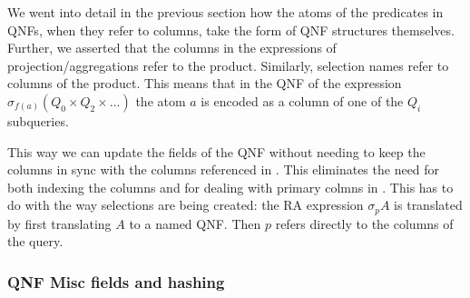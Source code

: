 We went into detail in the previous section how the atoms of the predicates in QNFs,
when they refer to columns, take the form of QNF structures themselves. Further, we asserted
that the columns in the expressions of projection/aggregations refer to the
product. Similarly, selection names refer to columns of the product.
This means that in the QNF of the expression \(\sigma_{f(a)} (Q_0 \times Q_2 \times ...)\)
the atom \(a\) is encoded as a column of one of the \(Q_i\) subqueries.


This way we can update the fields of the QNF without needing
to keep the columns in sync with the columns referenced in
. This eliminates the need for both indexing the columns and
for dealing with primary colmns in . This has to do with
the way selections are being created: the RA expression \(\sigma_p A\)
is translated by first translating \(A\) to a named QNF. Then \(p\)
refers directly to the columns of the query.

\subsubsection{QNF Misc fields and hashing}

